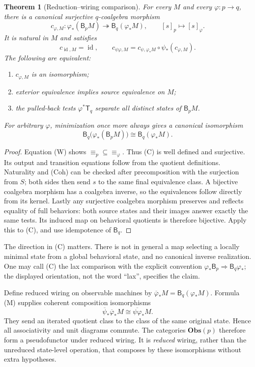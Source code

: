 \documentclass[11pt]{article}
\newtheorem{theorem}{Theorem}[section]
\theoremstyle{definition}
\theoremstyle{remark}\newtheorem{remark}[theorem]{Remark}
\newcommand{\id}{\operatorname{id}}
\newcommand{\Beh}{\mathsf B}
\newcommand{\Obs}{\mathbf{Obs}}
\newcommand{\Tests}{\mathsf T}
\begin{document}
\begin{theorem}[Reduction--wiring comparison]\label{p:thm:comparison}
For every $M$ and every $\varphi:p\to q$, there is a canonical
surjective $q$-coalgebra morphism
\[
 c_{\varphi,M}:\varphi_*(\Beh_pM)
       \twoheadrightarrow\Beh_q(\varphi_*M),
 \qquad [s]_p\longmapsto[s]_{\varphi}.                    \tag{C}
\]
It is natural in $M$ and satisfies
\[
 c_{\id,M}=\id,\qquad
 c_{\psi\varphi,M}
 =c_{\psi,\varphi_*M}\circ\psi_*(c_{\varphi,M}).          \tag{Coh}
\]
The following are equivalent:
\begin{enumerate}[label=\textup{(\roman*)}]
\item $c_{\varphi,M}$ is an isomorphism;
\item exterior equivalence implies source equivalence on $M$;
\item the pulled-back tests $\varphi^*\Tests_q$ separate all distinct states
of $\Beh_pM$.
\end{enumerate}
For arbitrary $\varphi$, minimization once more always gives a canonical
isomorphism
\[
 \Beh_q\bigl(\varphi_*(\Beh_pM)\bigr)
       \cong\Beh_q(\varphi_*M).                          \tag{M}
\]
\end{theorem}
\begin{proof}
Equation (W) shows $\equiv_p\subseteq\equiv_{\varphi}$. Thus (C) is
well defined and surjective. Its output and transition equations follow
from the quotient definitions. Naturality and (Coh) can be checked after
precomposition with the surjection from $S$; both sides then send $s$ to
the same final equivalence class. A bijective coalgebra morphism has a
coalgebra inverse, so the equivalences follow directly from its kernel.
Lastly any surjective coalgebra morphism preserves and reflects equality
of full behaviors: both source states and their images answer exactly
the same tests. Its induced map on behavioral quotients is therefore
bijective. Apply this to (C), and use idempotence of $\Beh_q$.
\end{proof}
The direction in (C) matters. There is not in general a map selecting a
locally minimal state from a global behavioral state, and no canonical
inverse realization. One may call (C) the lax comparison with the explicit
convention $\varphi_*\Beh_p\Rightarrow\Beh_q\varphi_*$; the displayed
orientation, not the word ``lax'', specifies the claim.

Define reduced wiring on observable machines by
$\overline{\varphi}_*M=\Beh_q(\varphi_*M)$. Formula (M) supplies coherent
composition isomorphisms
\[
 \overline{\psi}_*\overline{\varphi}_*M
       \cong\overline{\psi\varphi}_*M.
\]
They send an iterated quotient class to the class of the same original
state. Hence all associativity and unit diagrams commute. The categories
$\Obs(p)$ therefore form a pseudofunctor under reduced wiring. It is
\emph{reduced} wiring, rather than the unreduced state-level operation,
that composes by these isomorphisms without extra hypotheses.
\end{document}
